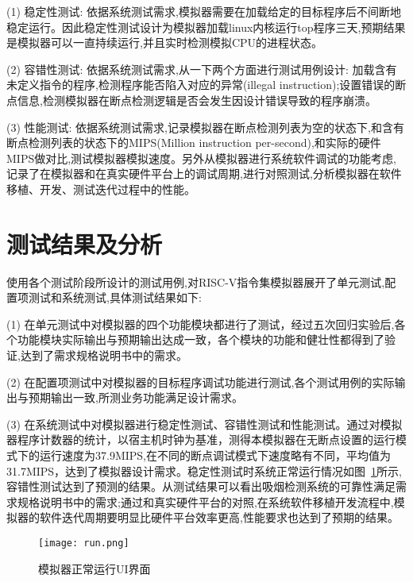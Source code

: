 (1)	稳定性测试: 依据系统测试需求,模拟器需要在加载给定的目标程序后不间断地稳定运行。因此稳定性测试设计为模拟器加载linux内核运行top程序三天,预期结果是模拟器可以一直持续运行,并且实时检测模拟CPU的进程状态。


(2)	容错性测试: 依据系统测试需求,从一下两个方面进行测试用例设计: 加载含有未定义指令的程序,检测程序能否陷入对应的异常(illegal instruction);设置错误的断点信息,检测模拟器在断点检测逻辑是否会发生因设计错误导致的程序崩溃。


(3)	性能测试: 依据系统测试需求,记录模拟器在断点检测列表为空的状态下,和含有断点检测列表的状态下的MIPS(Million instruction per-second),和实际的硬件MIPS做对比,测试模拟器模拟速度。另外从模拟器进行系统软件调试的功能考虑,记录了在模拟器和在真实硬件平台上的调试周期,进行对照测试,分析模拟器在软件移植、开发、测试迭代过程中的性能。

\section{测试结果及分析}
使用各个测试阶段所设计的测试用例,对RISC-V指令集模拟器展开了单元测试,配置项测试和系统测试,具体测试结果如下:


(1) 在单元测试中对模拟器的四个功能模块都进行了测试，经过五次回归实验后,各个功能模块实际输出与预期输出达成一致，各个模块的功能和健壮性都得到了验证,达到了需求规格说明书中的需求。


(2) 在配置项测试中对模拟器的目标程序调试功能进行测试,各个测试用例的实际输出与预期输出一致,所测业务功能满足设计需求。


(3) 在系统测试中对模拟器进行稳定性测试、容错性测试和性能测试。通过对模拟器程序计数器的统计，以宿主机时钟为基准，测得本模拟器在无断点设置的运行模式下的运行速度为37.9MIPS,在不同的断点调试模式下速度略有不同，平均值为31.7MIPS，达到了模拟器设计需求。稳定性测试时系统正常运行情况如图~\ref{fig:run}所示,容错性测试达到了预测的结果。从测试结果可以看出吸烟检测系统的可靠性满足需求规格说明书中的需求;通过和真实硬件平台的对照,在系统软件移植开发流程中,模拟器的软件迭代周期要明显比硬件平台效率更高,性能要求也达到了预期的结果。 
\begin{figure}[h]
  \centering
  \texttt{[image: run.png]}
  \caption{模拟器正常运行UI界面}
  \label{fig:run}
\end{figure}

